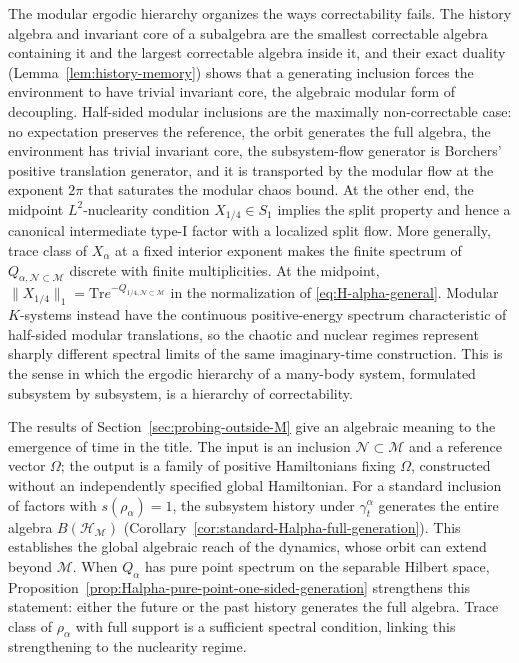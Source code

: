 \documentclass[a4paper,11pt]{article}
\theoremstyle{definition}
\newcommand{\Tr}{\text{Tr}}
\newcommand{\mN}{\mathcal{N}}
\newcommand{\mH}{\mathcal{H}}
\newcommand{\mM}{\mathcal{M}}
\begin{document}
The modular ergodic hierarchy organizes the ways correctability fails. The history algebra and invariant core of a subalgebra are the smallest correctable algebra containing it and the largest correctable algebra inside it, and their exact duality (Lemma~\ref{lem:history-memory}) shows that a generating inclusion forces the environment to have trivial invariant core, the algebraic modular form of decoupling. Half-sided modular inclusions are the maximally non-correctable case: no expectation preserves the reference, the orbit generates the full algebra, the environment has trivial invariant core, the subsystem-flow generator is Borchers' positive translation generator, and it is transported by the modular flow at the exponent $2\pi$ that saturates the modular chaos bound. At the other end, the midpoint $L^2$-nuclearity condition $X_{1/4}\in S_1$ implies the split property and hence a canonical intermediate type-I factor with a localized split flow. More generally, trace class of $X_\alpha$ at a fixed interior exponent makes the finite spectrum of $Q_{\alpha,\mN\subset\mM}$ discrete with finite multiplicities. At the midpoint, $\|X_{1/4}\|_1=\Tr e^{-Q_{1/4,\mN\subset\mM}}$ in the normalization of \eqref{eq:H-alpha-general}. Modular $K$-systems instead have the continuous positive-energy spectrum characteristic of half-sided modular translations, so the chaotic and nuclear regimes represent sharply different spectral limits of the same imaginary-time construction. This is the sense in which the ergodic hierarchy of a many-body system, formulated subsystem by subsystem, is a hierarchy of correctability.

The results of Section~\ref{sec:probing-outside-M} give an algebraic meaning to the emergence of time in the title. The input is an inclusion $\mN\subset\mM$ and a reference vector $\Omega$; the output is a family of positive Hamiltonians fixing $\Omega$, constructed without an independently specified global Hamiltonian. For a standard inclusion of factors with $s(\rho_\alpha)=1$, the subsystem history under $\gamma_t^\alpha$ generates the entire algebra $B(\mH_{\mM})$ (Corollary~\ref{cor:standard-Halpha-full-generation}). This establishes the global algebraic reach of the dynamics, whose orbit can extend beyond $\mM$. When $Q_\alpha$ has pure point spectrum on the separable Hilbert space, Proposition~\ref{prop:Halpha-pure-point-one-sided-generation} strengthens this statement: either the future or the past history generates the full algebra. Trace class of $\rho_\alpha$ with full support is a sufficient spectral condition, linking this strengthening to the nuclearity regime.
\end{document}
